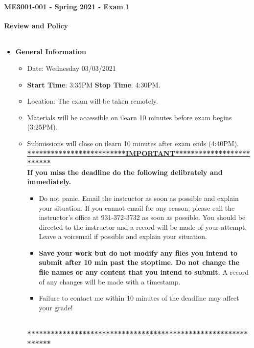 \documentclass[11pt]{article}
\begin{document}
\textbf{ \LARGE ME3001-001 - Spring 2021 - Exam 1\hspace{1mm} } \\\\
\hspace*{10mm}\textbf{ \LARGE Review and Policy  } \\\\

\begin{itemize}
	\item  \textbf{\Large General Information}

	\begin{itemize}

		\item Date: Wednesday 03/03/2021
		\item {\bf Start Time}: 3:35PM {\bf Stop Time}: 4:30PM.
		\item Location: The exam will be taken remotely. 
		 
		\item Materials will be accessible on ilearn 10 minutes before exam begins (3:25PM).
		\item Submissions will close on ilearn 10 minutes after exam ends (4:40PM). \vspace{1mm}\\
		
		{\R  \bf \underline{*************************IMPORTANT*************************}} \vspace{3mm}\\
			  {\R \bf If you miss the deadline do the following delibrately and immediately. }
		\begin{itemize}
			\item Do not panic. Email the instructor as soon as possible and explain your situation. If you cannot email for any reason, please call the instructor's office at 931-372-3732 as soon as possible. You should be directed to the instructor and a record will be made of your attempt. Leave a voicemail if possible and explain your situation.
			\item{\bf  Save your work but do not modify any files you intend to submit after 10 min past the stoptime. Do not change the file names or any content that you intend to submit.} A record of any changes will be made with a timestamp. \vspace{2mm}
			\item {\R Failure to contact me within 10 minutes of the deadline may affect your grade!}
		\end{itemize}
			{\R  \bf \underline{\hspace{140mm}}} \\
			{\R  \bf ***************************************************************} 
	\end{itemize}


\end{itemize}
\end{document}
